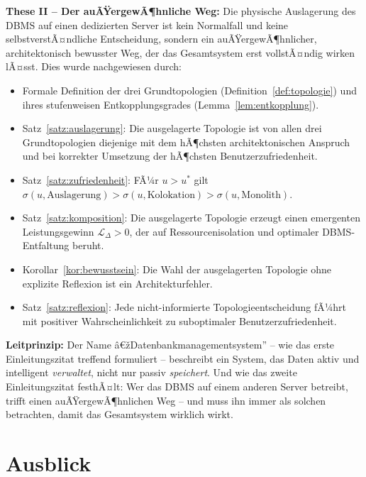 ﻿\documentclass[a4paper,12pt]{article}
\theoremstyle{definition}
\begin{document}
\textbf{These II -- Der auÃŸergewÃ¶hnliche Weg:} Die physische Auslagerung des DBMS auf einen dedizierten Server ist kein Normalfall und keine selbstverstÃ¤ndliche Entscheidung, sondern ein auÃŸergewÃ¶hnlicher, architektonisch bewusster Weg, der das Gesamtsystem erst vollstÃ¤ndig wirken lÃ¤sst. Dies wurde nachgewiesen durch:
\begin{itemize}
  \item Formale Definition der drei Grundtopologien (Definition~\ref{def:topologie}) und ihres stufenweisen Entkopplungsgrades (Lemma~\ref{lem:entkopplung}).
  \item Satz~\ref{satz:auslagerung}: Die ausgelagerte Topologie ist von allen drei Grundtopologien diejenige mit dem hÃ¶chsten architektonischen Anspruch und bei korrekter Umsetzung der hÃ¶chsten Benutzerzufriedenheit.
  \item Satz~\ref{satz:zufriedenheit}: FÃ¼r $u > u^*$ gilt $\sigma(u, \text{Auslagerung}) > \sigma(u, \text{Kolokation}) > \sigma(u, \text{Monolith})$.
  \item Satz~\ref{satz:komposition}: Die ausgelagerte Topologie erzeugt einen emergenten Leistungsgewinn $\mathcal{L}_\Delta > 0$, der auf Ressourcenisolation und optimaler DBMS-Entfaltung beruht.
  \item Korollar~\ref{kor:bewusstsein}: Die Wahl der ausgelagerten Topologie ohne explizite Reflexion ist ein Architekturfehler.
  \item Satz~\ref{satz:reflexion}: Jede nicht-informierte Topologieentscheidung fÃ¼hrt mit positiver Wahrscheinlichkeit zu suboptimaler Benutzerzufriedenheit.
\end{itemize}

\textbf{Leitprinzip:} Der Name â€žDatenbankmanagementsystem'' -- wie das erste Einleitungszitat treffend formuliert -- beschreibt ein System, das Daten aktiv und intelligent \emph{verwaltet}, nicht nur passiv \emph{speichert}. Und wie das zweite Einleitungszitat festhÃ¤lt: Wer das DBMS auf einem anderen Server betreibt, trifft einen auÃŸergewÃ¶hnlichen Weg -- und muss ihn immer als solchen betrachten, damit das Gesamtsystem wirklich wirkt.

\section{Ausblick}
\label{sec:ausblick}
\end{document}

